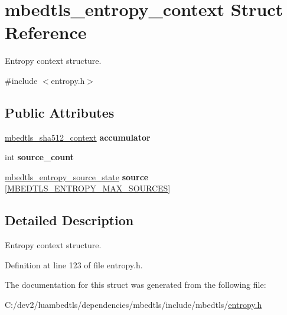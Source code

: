 \hypertarget{structmbedtls__entropy__context}{\section{mbedtls\-\_\-entropy\-\_\-context Struct Reference}
\label{structmbedtls__entropy__context}
}


Entropy context structure.  




{\ttfamily \#include $<$entropy.\-h$>$}

\subsection*{Public Attributes}
\begin{DoxyCompactItemize}
\item 
\hypertarget{structmbedtls__entropy__context_ae685a3bbe7478a809c511a57e7247422}{\hyperlink{structmbedtls__sha512__context}{mbedtls\-\_\-sha512\-\_\-context} {\bfseries accumulator}}\label{structmbedtls__entropy__context_ae685a3bbe7478a809c511a57e7247422}

\item 
\hypertarget{structmbedtls__entropy__context_ae21caec42d2e42c87762fcbb4079cb1b}{int {\bfseries source\-\_\-count}}\label{structmbedtls__entropy__context_ae21caec42d2e42c87762fcbb4079cb1b}

\item 
\hypertarget{structmbedtls__entropy__context_a8a95d0e03ef1bc1f198e23e201c064be}{\hyperlink{structmbedtls__entropy__source__state}{mbedtls\-\_\-entropy\-\_\-source\-\_\-state} {\bfseries source} \mbox{[}\hyperlink{entropy_8h_a819aa4f3046aa257738f0dafe481ca1f}{M\-B\-E\-D\-T\-L\-S\-\_\-\-E\-N\-T\-R\-O\-P\-Y\-\_\-\-M\-A\-X\-\_\-\-S\-O\-U\-R\-C\-E\-S}\mbox{]}}\label{structmbedtls__entropy__context_a8a95d0e03ef1bc1f198e23e201c064be}

\end{DoxyCompactItemize}


\subsection{Detailed Description}
Entropy context structure. 

Definition at line 123 of file entropy.\-h.



The documentation for this struct was generated from the following file\-:\begin{DoxyCompactItemize}
\item 
C\-:/dev2/luambedtls/dependencies/mbedtls/include/mbedtls/\hyperlink{entropy_8h}{entropy.\-h}\end{DoxyCompactItemize}
